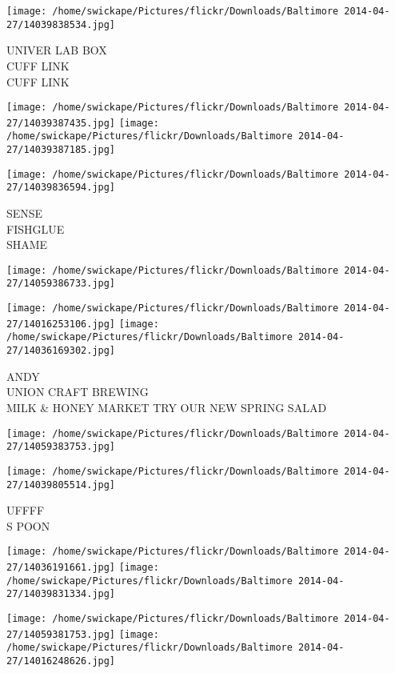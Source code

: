 \documentclass[10pt,letterpaper]{article}
\begin{document}
\vspace{0.25in}
\texttt{[image: /home/swickape/Pictures/flickr/Downloads/Baltimore 2014-04-27/14039838534.jpg]}

UNIVER LAB BOX\\
CUFF LINK\\
CUFF LINK
\pagebreak

\texttt{[image: /home/swickape/Pictures/flickr/Downloads/Baltimore 2014-04-27/14039387435.jpg]}
\texttt{[image: /home/swickape/Pictures/flickr/Downloads/Baltimore 2014-04-27/14039387185.jpg]}

\texttt{[image: /home/swickape/Pictures/flickr/Downloads/Baltimore 2014-04-27/14039836594.jpg]}

SENSE\\
FISHGLUE\\
SHAME
\pagebreak

\texttt{[image: /home/swickape/Pictures/flickr/Downloads/Baltimore 2014-04-27/14059386733.jpg]}

\vspace{0.25in}
\texttt{[image: /home/swickape/Pictures/flickr/Downloads/Baltimore 2014-04-27/14016253106.jpg]}
\texttt{[image: /home/swickape/Pictures/flickr/Downloads/Baltimore 2014-04-27/14036169302.jpg]}

ANDY\\
UNION CRAFT BREWING\\
MILK \& HONEY MARKET TRY OUR NEW SPRING SALAD
\pagebreak

\texttt{[image: /home/swickape/Pictures/flickr/Downloads/Baltimore 2014-04-27/14059383753.jpg]}

\vspace{0.25in}
\texttt{[image: /home/swickape/Pictures/flickr/Downloads/Baltimore 2014-04-27/14039805514.jpg]}

UFFFF\\
S POON
\pagebreak

\texttt{[image: /home/swickape/Pictures/flickr/Downloads/Baltimore 2014-04-27/14036191661.jpg]}
\texttt{[image: /home/swickape/Pictures/flickr/Downloads/Baltimore 2014-04-27/14039831334.jpg]}

\texttt{[image: /home/swickape/Pictures/flickr/Downloads/Baltimore 2014-04-27/14059381753.jpg]}
\texttt{[image: /home/swickape/Pictures/flickr/Downloads/Baltimore 2014-04-27/14016248626.jpg]}
\end{document}
